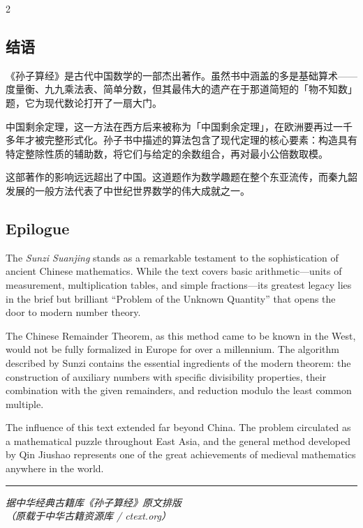\documentclass[11pt,a4paper]{article}
\newcommand{\longline}{\noindent\rule{\textwidth}{0.4pt}}
\begin{document}
\newpage

\begin{paracol}{2}

\begin{classicalbox}
\section*{结语}

《孙子算经》是古代中国数学的一部杰出著作。虽然书中涵盖的多是基础算术——度量衡、九九乘法表、简单分数，但其最伟大的遗产在于那道简短的「物不知数」题，它为现代数论打开了一扇大门。

中国剩余定理，这一方法在西方后来被称为「中国剩余定理」，在欧洲要再过一千多年才被完整形式化。孙子书中描述的算法包含了现代定理的核心要素：构造具有特定整除性质的辅助数，将它们与给定的余数组合，再对最小公倍数取模。

这部著作的影响远远超出了中国。这道题作为数学趣题在整个东亚流传，而秦九韶发展的一般方法代表了中世纪世界数学的伟大成就之一。
\end{classicalbox}

\switchcolumn

\begin{modernbox}
\section*{Epilogue}

The \textit{Sunzi Suanjing} stands as a remarkable testament to the sophistication of ancient Chinese mathematics. While the text covers basic arithmetic—units of measurement, multiplication tables, and simple fractions—its greatest legacy lies in the brief but brilliant ``Problem of the Unknown Quantity'' that opens the door to modern number theory.

The Chinese Remainder Theorem, as this method came to be known in the West, would not be fully formalized in Europe for over a millennium. The algorithm described by Sunzi contains the essential ingredients of the modern theorem: the construction of auxiliary numbers with specific divisibility properties, their combination with the given remainders, and reduction modulo the least common multiple.

The influence of this text extended far beyond China. The problem circulated as a mathematical puzzle throughout East Asia, and the general method developed by Qin Jiushao represents one of the great achievements of medieval mathematics anywhere in the world.
\end{modernbox}

\end{paracol}

\vspace{1cm}
\begin{center}
\longline
\end{center}

\vspace{0.5cm}

\begin{center}
\textit{据中华经典古籍库《孙子算经》原文排版}\\
\textit{（原载于中华古籍资源库 / ctext.org）}
\end{center}
\end{document}
